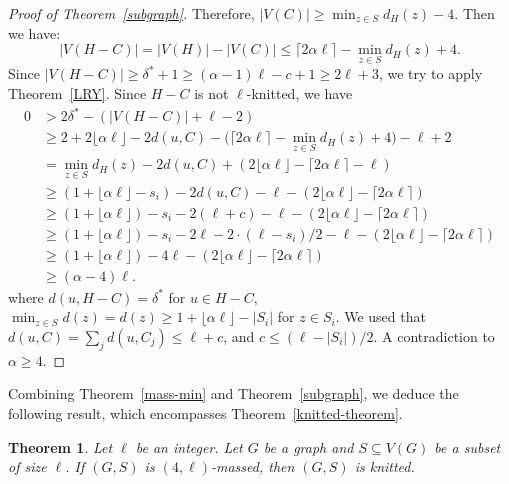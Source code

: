 \documentclass[11pt]{amsart}
\newtheorem{theorem}{Theorem}
\begin{document}
\begin{proof}[Proof of Theorem~\ref{subgraph}]
Therefore, $|V(C)| \ge \min_{z\in S} d_H(z)-4$. Then we have:
\[ |V(H-C)| = |V(H)| - |V(C)| \le \lceil 2\alpha \ell\rceil - \min_{z\in S} d_H(z)+4. \]
Since $|V(H-C)|\ge \delta^*+1\ge (\alpha-1)\ell-c+1\ge 2\ell+3$, we try to apply Theorem~\ref{LRY}. Since $H-C$ is not $\ell$-knitted, we have 
\begin{align*}
0&>2\delta^* - \left(|V(H-C)| + \ell - 2 \right)\\
&\ge 2+2\lfloor\alpha\ell\rfloor-2d(u,C) - \big(\lceil 2\alpha \ell\rceil - \min_{z\in S} d_H(z)+4\big)- \ell + 2 \\
&= \min_{z\in S} d_H(z)-2d(u,C)+(2\lfloor\alpha\ell\rfloor-\lceil 2\alpha \ell\rceil-\ell)\\
&\ge (1+\lfloor\alpha\ell\rfloor-s_i)-2d(u,C)-\ell-(2\lfloor\alpha\ell\rfloor-\lceil 2\alpha \ell\rceil)\\
&\ge (1+\lfloor\alpha\ell\rfloor)-s_i-2(\ell+c)-\ell-(2\lfloor\alpha\ell\rfloor-\lceil 2\alpha \ell\rceil)\\
&\ge (1+\lfloor\alpha\ell\rfloor)-s_i-2\ell-2\cdot (\ell-s_i)/2-\ell-(2\lfloor\alpha\ell\rfloor-\lceil 2\alpha \ell\rceil)\\
&\ge (1+\lfloor\alpha\ell\rfloor)-4\ell-(2\lfloor\alpha\ell\rfloor-\lceil 2\alpha \ell\rceil)\\
&\ge (\alpha-4)\ell.
\end{align*}
where $d(u,H-C)=\delta^*$ for $u\in H-C$, $\min_{z\in S} d(z)=d(z)\ge 1+\lfloor\alpha\ell\rfloor-|S_i|$ for $z\in S_i$. We used that $d(u,C)=\sum_j d(u,C_j)\le \ell+c$, and $c\le (\ell-|S_i|)/2$.
A contradiction to $\alpha\ge 4$.
\end{proof}






Combining Theorem~\ref{mass-min} and Theorem~\ref{subgraph}, we deduce the following result, which encompasses Theorem~\ref{knitted-theorem}.

\begin{theorem}\label{dense-graphs}
Let $\ell$ be an integer. Let $G$ be a graph and $S\subseteq V(G)$ be a subset of size $\ell$. If $(G,S)$ is $(4, \ell)$-massed, then $(G,S)$ is knitted. 
\end{theorem}
\end{document}
